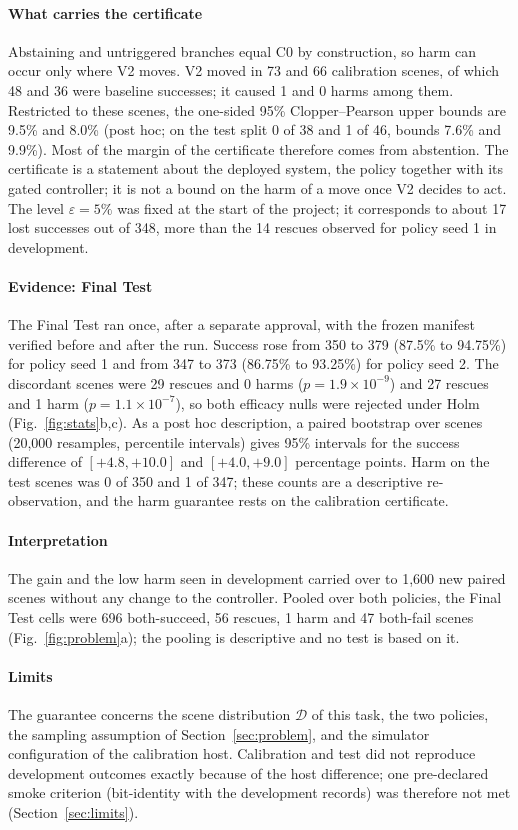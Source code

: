 \paragraph{What carries the certificate} Abstaining and untriggered branches equal C0 by construction, so harm can occur only where V2 moves. V2 moved in 73 and 66 calibration scenes, of which 48 and 36 were baseline successes; it caused 1 and 0 harms among them. Restricted to these scenes, the one-sided 95\% Clopper--Pearson upper bounds are 9.5\% and 8.0\% (post hoc; on the test split 0 of 38 and 1 of 46, bounds 7.6\% and 9.9\%). Most of the margin of the certificate therefore comes from abstention. The certificate is a statement about the deployed system, the policy together with its gated controller; it is not a bound on the harm of a move once V2 decides to act. The level $\varepsilon=5\%$ was fixed at the start of the project; it corresponds to about 17 lost successes out of 348, more than the 14 rescues observed for policy seed 1 in development.

\paragraph{Evidence: Final Test} The Final Test ran once, after a separate approval, with the frozen manifest verified before and after the run. Success rose from 350 to 379 (87.5\% to 94.75\%) for policy seed 1 and from 347 to 373 (86.75\% to 93.25\%) for policy seed 2. The discordant scenes were 29 rescues and 0 harms ($p=1.9\times10^{-9}$) and 27 rescues and 1 harm ($p=1.1\times10^{-7}$), so both efficacy nulls were rejected under Holm (Fig.~\ref{fig:stats}b,c). As a post hoc description, a paired bootstrap over scenes (20,000 resamples, percentile intervals) gives 95\% intervals for the success difference of $[+4.8, +10.0]$ and $[+4.0, +9.0]$ percentage points. Harm on the test scenes was 0 of 350 and 1 of 347; these counts are a descriptive re-observation, and the harm guarantee rests on the calibration certificate.

\paragraph{Interpretation} The gain and the low harm seen in development carried over to 1,600 new paired scenes without any change to the controller. Pooled over both policies, the Final Test cells were 696 both-succeed, 56 rescues, 1 harm and 47 both-fail scenes (Fig.~\ref{fig:problem}a); the pooling is descriptive and no test is based on it.

\paragraph{Limits} The guarantee concerns the scene distribution $\mathcal{D}$ of this task, the two policies, the sampling assumption of Section~\ref{sec:problem}, and the simulator configuration of the calibration host. Calibration and test did not reproduce development outcomes exactly because of the host difference; one pre-declared smoke criterion (bit-identity with the development records) was therefore not met (Section~\ref{sec:limits}).
